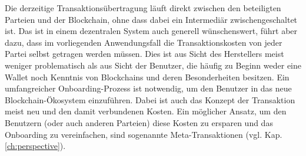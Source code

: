 Die derzeitige Transaktionsübertragung läuft direkt zwischen den beteiligten Parteien und der Blockchain, ohne dass dabei ein Intermediär zwischengeschaltet ist. Das ist in einem dezentralen System auch generell wünschenswert, führt aber dazu, dass im vorliegenden Anwendungsfall die Transaktionskosten von jeder Partei selbst getragen werden müssen. Dies ist aus Sicht des Herstellers meist weniger problematisch als aus Sicht der Benutzer, die häufig zu Beginn weder eine Wallet noch Kenntnis von Blockchains und deren Besonderheiten besitzen. Ein umfangreicher Onboarding-Prozess ist notwendig, um den Benutzer in das neue Blockchain-Ökosystem einzuführen. Dabei ist auch das Konzept der Transaktion meist neu und den damit verbundenen Kosten. Ein möglicher Ansatz, um den Benutzern (oder auch anderen Parteien) diese Kosten zu ersparen und das Onboarding zu vereinfachen, sind sogenannte Meta-Transaktionen (vgl. Kap. \ref{ch:perspective}).


